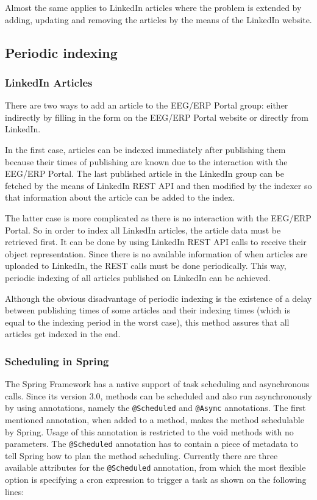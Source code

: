 Almost the same applies to LinkedIn articles where the problem is extended by adding, updating and removing the articles by the means of the LinkedIn website. 

\subsection{Periodic indexing}

\subsubsection{LinkedIn Articles}
There are two ways to add an article to the EEG/ERP Portal group: either indirectly by filling in the form on the EEG/ERP Portal website or directly from LinkedIn.

In the first case, articles can be indexed immediately after publishing them because their times of publishing are known due to the interaction with the EEG/ERP Portal. 
The last published article in the LinkedIn group can be fetched by the means of LinkedIn REST API and then modified by the indexer so that information about the article can be added to the index.

The latter case is more complicated as there is no interaction with the EEG/ERP Portal. 
So in order to index all LinkedIn articles, the article data must be retrieved first.
It can be done by using LinkedIn REST API calls to receive their object representation.
Since there is no available information of when articles are uploaded to LinkedIn, the REST calls must be done periodically.
This way, periodic indexing of all articles published on LinkedIn can be achieved.

Although the obvious disadvantage of periodic indexing is the existence of a delay between publishing times of some articles and their indexing times (which is equal to the indexing period in the worst case), this method assures that all articles get indexed in the end.

\subsubsection{Scheduling in Spring}


The Spring Framework has a native support of task scheduling and asynchronous calls. 
Since its version 3.0, methods can be scheduled and also run asynchronously by using annotations, namely the \texttt{@Scheduled} and \texttt{@Async} annotations. 
The first mentioned annotation, when added to a method, makes the method schedulable by Spring. 
Usage of this annotation is restricted to the void methods with no parameters. 
The \texttt{@Scheduled} annotation has to contain a piece of metadata to tell Spring how to plan the method scheduling. 
Currently there are three available attributes for the \texttt{@Scheduled} annotation, from which the most flexible option is specifying a cron expression to trigger a task as shown on the following lines:

